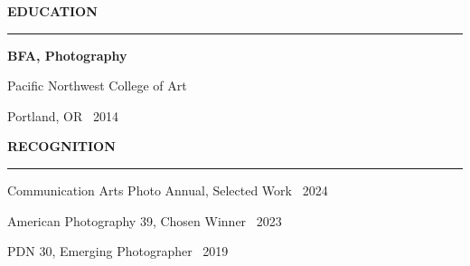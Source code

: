 \documentclass[10pt,a4paper]{article}
\newcommand{\sideheading}[1]{%
  \vspace{3.2mm}%
  {\fontsize{8.5}{10}\selectfont\bfseries\color{terracotta}\MakeUppercase{#1}}\par
  \vspace{1.2mm}%
  {\color{rulecolor}\rule{\linewidth}{0.45pt}}\par
  \vspace{2.1mm}%
}
\begin{document}
\begin{minipage}[t]{51mm}
  \sideheading{Education}
  {\fontsize{9}{11}\selectfont\bfseries\color{ink}BFA, Photography}\par
  {\fontsize{8.45}{10.6}\selectfont\color{muted}Pacific Northwest College of Art\par Portland, OR \textbullet\ 2014}

  \sideheading{Recognition}
  {\fontsize{8.55}{11.5}\selectfont\color{ink}
    Communication Arts Photo Annual, Selected Work \textbullet\ 2024\par\vspace{1mm}
    American Photography 39, Chosen Winner \textbullet\ 2023\par\vspace{1mm}
    PDN 30, Emerging Photographer \textbullet\ 2019
  }
\end{minipage}%
\hspace*{14mm}%
\end{document}
